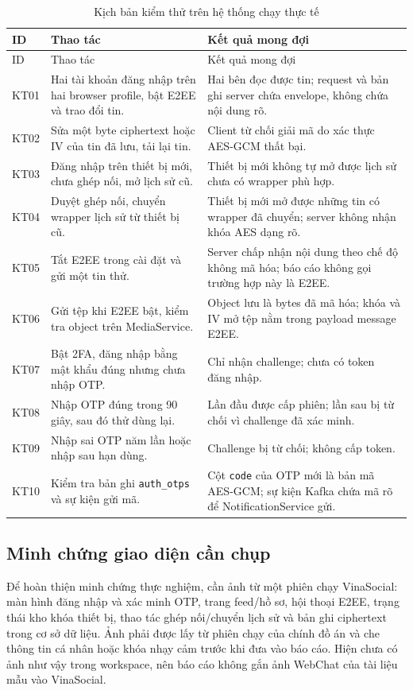 \begin{longtable}{p{}p{}p{}}
\caption{Kịch bản kiểm thử trên hệ thống chạy thực tế}\label{tab:manual-test}\\
\toprule
ID & Thao tác & Kết quả mong đợi \\
\midrule
\endfirsthead
\toprule ID & Thao tác & Kết quả mong đợi \\ \midrule
\endhead
KT01 & Hai tài khoản đăng nhập trên hai browser profile, bật E2EE và trao đổi tin. & Hai bên đọc được tin; request và bản ghi server chứa envelope, không chứa nội dung rõ. \\
KT02 & Sửa một byte ciphertext hoặc IV của tin đã lưu, tải lại tin. & Client từ chối giải mã do xác thực AES-GCM thất bại. \\
KT03 & Đăng nhập trên thiết bị mới, chưa ghép nối, mở lịch sử cũ. & Thiết bị mới không tự mở được lịch sử chưa có wrapper phù hợp. \\
KT04 & Duyệt ghép nối, chuyển wrapper lịch sử từ thiết bị cũ. & Thiết bị mới mở được những tin có wrapper đã chuyển; server không nhận khóa AES dạng rõ. \\
KT05 & Tắt E2EE trong cài đặt và gửi một tin thử. & Server chấp nhận nội dung theo chế độ không mã hóa; báo cáo không gọi trường hợp này là E2EE. \\
KT06 & Gửi tệp khi E2EE bật, kiểm tra object trên MediaService. & Object lưu là bytes đã mã hóa; khóa và IV mở tệp nằm trong payload message E2EE. \\
KT07 & Bật 2FA, đăng nhập bằng mật khẩu đúng nhưng chưa nhập OTP. & Chỉ nhận challenge; chưa có token đăng nhập. \\
KT08 & Nhập OTP đúng trong 90 giây, sau đó thử dùng lại. & Lần đầu được cấp phiên; lần sau bị từ chối vì challenge đã xác minh. \\
KT09 & Nhập sai OTP năm lần hoặc nhập sau hạn dùng. & Challenge bị từ chối; không cấp token. \\
KT10 & Kiểm tra bản ghi \texttt{auth\_otps} và sự kiện gửi mã. & Cột \texttt{code} của OTP mới là bản mã AES-GCM; sự kiện Kafka chứa mã rõ để NotificationService gửi. \\
\bottomrule
\end{longtable}

\subsection{Minh chứng giao diện cần chụp}
Để hoàn thiện minh chứng thực nghiệm, cần ảnh từ một phiên chạy VinaSocial: màn hình đăng nhập và xác minh OTP, trang feed/hồ sơ, hội thoại E2EE, trạng thái kho khóa thiết bị, thao tác ghép nối/chuyển lịch sử và bản ghi ciphertext trong cơ sở dữ liệu. Ảnh phải được lấy từ phiên chạy của chính đồ án và che thông tin cá nhân hoặc khóa nhạy cảm trước khi đưa vào báo cáo. Hiện chưa có ảnh như vậy trong workspace, nên báo cáo không gắn ảnh WebChat của tài liệu mẫu vào VinaSocial.
